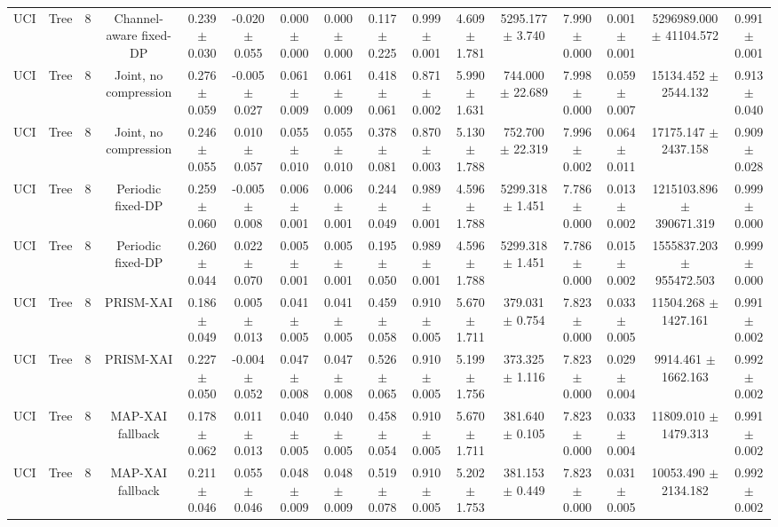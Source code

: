 \begin{tabular}{lccccccccccccccc}
UCI & Tree & 8 & Channel-aware fixed-DP & 0.239 $\pm$ 0.030 & -0.020 $\pm$ 0.055 & 0.000 $\pm$ 0.000 & 0.000 $\pm$ 0.000 & 0.117 $\pm$ 0.225 & 0.999 $\pm$ 0.001 & 4.609 $\pm$ 1.781 & 5295.177 $\pm$ 3.740 & 7.990 $\pm$ 0.000 & 0.001 $\pm$ 0.001 & 5296989.000 $\pm$ 41104.572 & 0.991 $\pm$ 0.001 \\
UCI & Tree & 8 & Joint, no compression & 0.276 $\pm$ 0.059 & -0.005 $\pm$ 0.027 & 0.061 $\pm$ 0.009 & 0.061 $\pm$ 0.009 & 0.418 $\pm$ 0.061 & 0.871 $\pm$ 0.002 & 5.990 $\pm$ 1.631 & 744.000 $\pm$ 22.689 & 7.998 $\pm$ 0.000 & 0.059 $\pm$ 0.007 & 15134.452 $\pm$ 2544.132 & 0.913 $\pm$ 0.040 \\
UCI & Tree & 8 & Joint, no compression & 0.246 $\pm$ 0.055 & 0.010 $\pm$ 0.057 & 0.055 $\pm$ 0.010 & 0.055 $\pm$ 0.010 & 0.378 $\pm$ 0.081 & 0.870 $\pm$ 0.003 & 5.130 $\pm$ 1.788 & 752.700 $\pm$ 22.319 & 7.996 $\pm$ 0.002 & 0.064 $\pm$ 0.011 & 17175.147 $\pm$ 2437.158 & 0.909 $\pm$ 0.028 \\
UCI & Tree & 8 & Periodic fixed-DP & 0.259 $\pm$ 0.060 & -0.005 $\pm$ 0.008 & 0.006 $\pm$ 0.001 & 0.006 $\pm$ 0.001 & 0.244 $\pm$ 0.049 & 0.989 $\pm$ 0.001 & 4.596 $\pm$ 1.788 & 5299.318 $\pm$ 1.451 & 7.786 $\pm$ 0.000 & 0.013 $\pm$ 0.002 & 1215103.896 $\pm$ 390671.319 & 0.999 $\pm$ 0.000 \\
UCI & Tree & 8 & Periodic fixed-DP & 0.260 $\pm$ 0.044 & 0.022 $\pm$ 0.070 & 0.005 $\pm$ 0.001 & 0.005 $\pm$ 0.001 & 0.195 $\pm$ 0.050 & 0.989 $\pm$ 0.001 & 4.596 $\pm$ 1.788 & 5299.318 $\pm$ 1.451 & 7.786 $\pm$ 0.000 & 0.015 $\pm$ 0.002 & 1555837.203 $\pm$ 955472.503 & 0.999 $\pm$ 0.000 \\
UCI & Tree & 8 & PRISM-XAI & 0.186 $\pm$ 0.049 & 0.005 $\pm$ 0.013 & 0.041 $\pm$ 0.005 & 0.041 $\pm$ 0.005 & 0.459 $\pm$ 0.058 & 0.910 $\pm$ 0.005 & 5.670 $\pm$ 1.711 & 379.031 $\pm$ 0.754 & 7.823 $\pm$ 0.000 & 0.033 $\pm$ 0.005 & 11504.268 $\pm$ 1427.161 & 0.991 $\pm$ 0.002 \\
UCI & Tree & 8 & PRISM-XAI & 0.227 $\pm$ 0.050 & -0.004 $\pm$ 0.052 & 0.047 $\pm$ 0.008 & 0.047 $\pm$ 0.008 & 0.526 $\pm$ 0.065 & 0.910 $\pm$ 0.005 & 5.199 $\pm$ 1.756 & 373.325 $\pm$ 1.116 & 7.823 $\pm$ 0.000 & 0.029 $\pm$ 0.004 & 9914.461 $\pm$ 1662.163 & 0.992 $\pm$ 0.002 \\
UCI & Tree & 8 & MAP-XAI fallback & 0.178 $\pm$ 0.062 & 0.011 $\pm$ 0.013 & 0.040 $\pm$ 0.005 & 0.040 $\pm$ 0.005 & 0.458 $\pm$ 0.054 & 0.910 $\pm$ 0.005 & 5.670 $\pm$ 1.711 & 381.640 $\pm$ 0.105 & 7.823 $\pm$ 0.000 & 0.033 $\pm$ 0.004 & 11809.010 $\pm$ 1479.313 & 0.991 $\pm$ 0.002 \\
UCI & Tree & 8 & MAP-XAI fallback & 0.211 $\pm$ 0.046 & 0.055 $\pm$ 0.046 & 0.048 $\pm$ 0.009 & 0.048 $\pm$ 0.009 & 0.519 $\pm$ 0.078 & 0.910 $\pm$ 0.005 & 5.202 $\pm$ 1.753 & 381.153 $\pm$ 0.449 & 7.823 $\pm$ 0.000 & 0.031 $\pm$ 0.005 & 10053.490 $\pm$ 2134.182 & 0.992 $\pm$ 0.002 \\
\bottomrule
\end{tabular}
